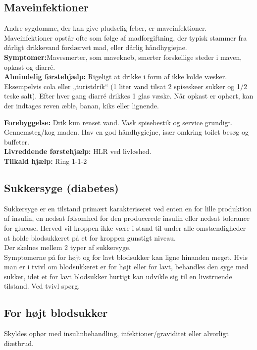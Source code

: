 \documentclass[../../../main.tex]{subfiles}
\begin{document}
\begin{multicols}{2}
\subsection*{Maveinfektioner} Andre sygdomme, der kan give pludselig feber, er
maveinfektioner. Maveinfektioner opstår ofte som følge af madforgiftning, der typisk stammer fra dårligt drikkevand fordærvet mad, eller dårlig håndhygiejne.
\\

\textbf{Symptomer:}Mavesmerter, som mavekneb, smerter forskellige steder i maven, opkast og diarré.
\\

\textbf{Almindelig førstehjælp:} Rigeligt at drikke i form af ikke kolde væsker. Eksempelvis cola eller „turistdrik“ (1 liter vand tilsat 2 spiseskeer sukker og 1/2 teske salt). Efter hver gang diarré drikkes 1 glas væske. Når opkast er ophørt, kan der indtages reven æble, banan, kiks eller lignende.

\textbf{Forebyggelse:} Drik kun renset vand. Vask spisebestik og service
grundigt. Gennemsteg/kog maden. Hav en god håndhygiejne, især omkring toilet besøg og buffeter.
\\

\textbf{Livreddende førstehjælp:} HLR ved livløshed.
\\

\textbf{Tilkald hjælp:} Ring 1-1-2
\\

\subsection*{Sukkersyge (diabetes)} Sukkersyge er en tilstand primært karakteriseret ved enten en for lille produktion af insulin, en nedsat følsomhed for den producerede insulin eller nedsat tolerance for glucose. Herved vil kroppen ikke være i stand til under alle omstændigheder at holde blodsukkeret på et for kroppen gunstigt niveau.
\\

\textbf{}Der skelnes mellem 2 typer af sukkersyge. 
\\

\textbf{}Symptomerne på for højt og for lavt blodsukker kan ligne hinanden meget. Hvis man er i tvivl om blodsukkeret er for højt eller for lavt, behandles den syge med sukker, idet et for lavt blodsukker hurtigt kan udvikle sig til en livstruende tilstand. Ved tvivl spørg.
\\

\subsection*{For højt blodsukker} Skyldes ophør med insulinbehandling, infektioner/graviditet eller alvorligt diætbrud.
\\


\end{multicols}
\end{document}
